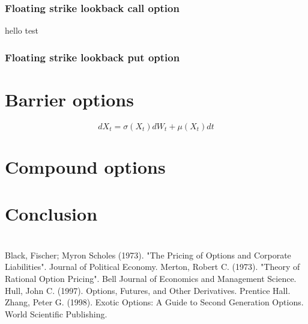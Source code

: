 \documentclass{article}
\begin{document}
\subsubsection{Floating strike lookback call option
}
hello test
\subsubsection{Floating strike lookback put option
}

\section{Barrier options
}


\[
dX_t=\sigma(X_t)dW_t + \mu(X_t) dt
\]


\section{Compound options
}


\section{Conclusion}


\newpage
\section*{} \label{bibsection}


\begin{thebibliography}{MMMMM} 
 Black, Fischer; Myron Scholes (1973). "The Pricing of Options and Corporate Liabilities". Journal of Political Economy.
 Merton, Robert C. (1973). "Theory of Rational Option Pricing". Bell Journal of Economics and Management Science.
 Hull, John C. (1997). Options, Futures, and Other Derivatives. Prentice Hall.
 Zhang, Peter G. (1998). Exotic Options: A Guide to Second Generation Options. World Scientific Publishing.

\end{thebibliography}


\end{document}

